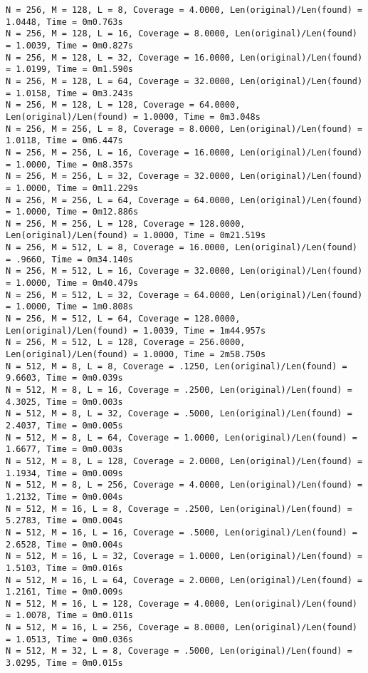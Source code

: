 \documentclass{article}
\begin{document}
{\begin{verbatim}
N = 256, M = 128, L = 8, Coverage = 4.0000, Len(original)/Len(found) = 1.0448, Time = 0m0.763s
N = 256, M = 128, L = 16, Coverage = 8.0000, Len(original)/Len(found) = 1.0039, Time = 0m0.827s
N = 256, M = 128, L = 32, Coverage = 16.0000, Len(original)/Len(found) = 1.0199, Time = 0m1.590s
N = 256, M = 128, L = 64, Coverage = 32.0000, Len(original)/Len(found) = 1.0158, Time = 0m3.243s
N = 256, M = 128, L = 128, Coverage = 64.0000, Len(original)/Len(found) = 1.0000, Time = 0m3.048s
N = 256, M = 256, L = 8, Coverage = 8.0000, Len(original)/Len(found) = 1.0118, Time = 0m6.447s
N = 256, M = 256, L = 16, Coverage = 16.0000, Len(original)/Len(found) = 1.0000, Time = 0m8.357s
N = 256, M = 256, L = 32, Coverage = 32.0000, Len(original)/Len(found) = 1.0000, Time = 0m11.229s
N = 256, M = 256, L = 64, Coverage = 64.0000, Len(original)/Len(found) = 1.0000, Time = 0m12.886s
N = 256, M = 256, L = 128, Coverage = 128.0000, Len(original)/Len(found) = 1.0000, Time = 0m21.519s
N = 256, M = 512, L = 8, Coverage = 16.0000, Len(original)/Len(found) = .9660, Time = 0m34.140s
N = 256, M = 512, L = 16, Coverage = 32.0000, Len(original)/Len(found) = 1.0000, Time = 0m40.479s
N = 256, M = 512, L = 32, Coverage = 64.0000, Len(original)/Len(found) = 1.0000, Time = 1m0.808s
N = 256, M = 512, L = 64, Coverage = 128.0000, Len(original)/Len(found) = 1.0039, Time = 1m44.957s
N = 256, M = 512, L = 128, Coverage = 256.0000, Len(original)/Len(found) = 1.0000, Time = 2m58.750s
N = 512, M = 8, L = 8, Coverage = .1250, Len(original)/Len(found) = 9.6603, Time = 0m0.039s
N = 512, M = 8, L = 16, Coverage = .2500, Len(original)/Len(found) = 4.3025, Time = 0m0.003s
N = 512, M = 8, L = 32, Coverage = .5000, Len(original)/Len(found) = 2.4037, Time = 0m0.005s
N = 512, M = 8, L = 64, Coverage = 1.0000, Len(original)/Len(found) = 1.6677, Time = 0m0.003s
N = 512, M = 8, L = 128, Coverage = 2.0000, Len(original)/Len(found) = 1.1934, Time = 0m0.009s
N = 512, M = 8, L = 256, Coverage = 4.0000, Len(original)/Len(found) = 1.2132, Time = 0m0.004s
N = 512, M = 16, L = 8, Coverage = .2500, Len(original)/Len(found) = 5.2783, Time = 0m0.004s
N = 512, M = 16, L = 16, Coverage = .5000, Len(original)/Len(found) = 2.6528, Time = 0m0.004s
N = 512, M = 16, L = 32, Coverage = 1.0000, Len(original)/Len(found) = 1.5103, Time = 0m0.016s
N = 512, M = 16, L = 64, Coverage = 2.0000, Len(original)/Len(found) = 1.2161, Time = 0m0.009s
N = 512, M = 16, L = 128, Coverage = 4.0000, Len(original)/Len(found) = 1.0078, Time = 0m0.011s
N = 512, M = 16, L = 256, Coverage = 8.0000, Len(original)/Len(found) = 1.0513, Time = 0m0.036s
N = 512, M = 32, L = 8, Coverage = .5000, Len(original)/Len(found) = 3.0295, Time = 0m0.015s

\end{verbatim}}
\end{document}
